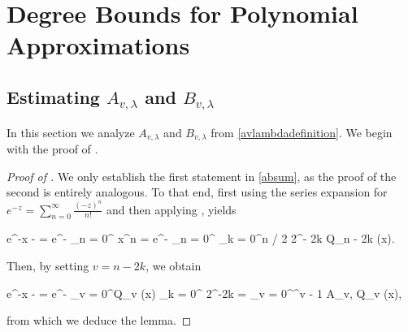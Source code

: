 \documentclass[10pt,a4paper]{article}
\theoremstyle{plain}\newtheorem{theorem}{Theorem}
\theoremstyle{definition}
\begin{document}
	
	
	
	
	
	
	
	













\section{Degree Bounds for Polynomial Approximations}

\label{ProofEstimate}


	
	
	
	
	
	
	\subsection{Estimating $A_{v, \lambda}$ and $B_{v, \lambda}$}
	
	
	\label{Proofavlambdabvlambda}
	
	
	
	In this section we analyze $A_{v, \lambda}$ and $B_{v, \lambda}$ from \eqref{avlambdadefinition}. We begin with the proof of .
	
	\begin{proof}[Proof of ] 
	
	We only establish the first statement in \eqref{absum}, as the proof of the second is entirely analogous. To that end, first using the series expansion for $e^{-z} = \sum_{n = 0}^{\infty} \frac{(-z)^n}{n!}$ and then applying , yields
	\begin{flalign*}
	e^{-\lambda x - \lambda} = e^{-\lambda} \displaystyle\sum_{n = 0}^{\infty} \displaystyle{} x^n =  e^{-\lambda} \displaystyle\sum_{n = 0}^{\infty} \displaystyle{} \displaystyle\sum_{k = 0}^{\lfloor n / 2 \rfloor} 2^{- 2k}  Q_{n - 2k} (x).
	\end{flalign*}
	
	\noindent Then, by setting $v = n - 2k$, we obtain
	\begin{flalign*}
	e^{-\lambda x - \lambda} = e^{-\lambda} \displaystyle\sum_{v = 0}^\infty  Q_v (x) \displaystyle\sum_{k = 0}^{\infty}  \displaystyle{} 2^{-2k}  = \displaystyle\sum_{v = 0}^^{v - 1} A_{v, \lambda} Q_v (x),
	\end{flalign*} 
	
	\noindent from which we deduce the lemma. 
	\end{proof}
	
\end{document}
